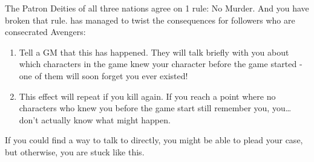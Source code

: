\documentclass[green]{GL2020}
\begin{document}
\name{\gMurderChup{}}

The Patron Deities of all three nations agree on 1 rule: No Murder. And you have broken that rule. \cGenesis{} has managed to twist the consequences for \cGenesis{\their} followers who are consecrated Avengers:

\begin{enumerate}
  \item Tell a GM that this has happened. They will talk briefly with you about which characters in the game knew your character before the game started - one of them will soon forget you ever existed!
  \item This effect will repeat if you kill again. If you reach a point where no characters who knew you before the game start still remember you, you\ldots{} don’t actually know what might happen.
\end{enumerate}

If you could find a way to talk to \cGenesis{} directly, you might be able to plead your case, but otherwise, you are stuck like this.
\end{document}
